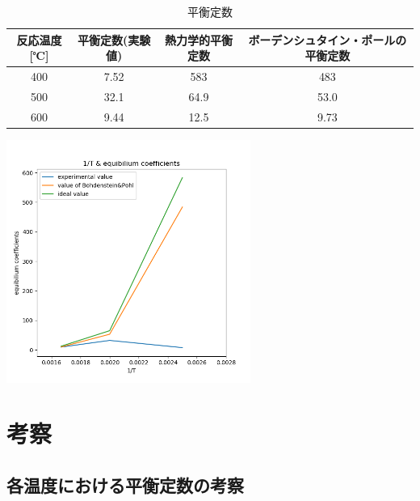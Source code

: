 \documentclass{ltjsarticle}
\begin{document}
\begin{table}[htb]
    \caption{平衡定数}
    \begin{center}
        \begin{tabular}{|c|c|c|c|}\hline
            反応温度[℃] & 平衡定数(実験値) & 熱力学的平衡定数 & ボーデンシュタイン・ポールの平衡定数 \\  \hline\hline
            400         & 7.52             & 583              & 483                                  \\ \hline
            500         & 32.1             & 64.9             & 53.0                                 \\ \hline
            600         & 9.44             & 12.5             & 9.73                                 \\ \hline
        \end{tabular}
    \end{center}
\end{table}

\includegraphics[width=8cm]{Figure_1.png}

\section{考察}
\subsection{各温度における平衡定数の考察}
\end{document}
